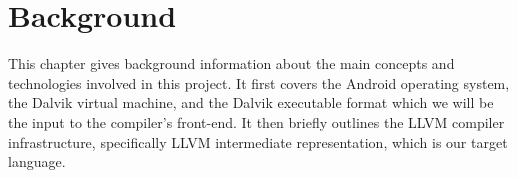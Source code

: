 \chapter{Background}
\label{chap:background}

This chapter gives background information about the main concepts and technologies involved in this project. It first covers the Android operating system, the Dalvik virtual machine, and the Dalvik executable format which we will be the input to the compiler's front-end. It then briefly outlines the LLVM compiler infrastructure, specifically LLVM intermediate representation, which is our target language.








